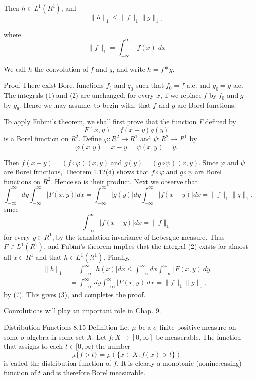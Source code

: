 Then $h \in L^1\left(R^1\right)$, and
$$
\|h\|_1 \leq\|f\|_1\|g\|_1,
$$

where
$$
\|f\|_1=\int_{-\infty}^{\infty}|f(x)| d x
$$

We call $h$ the convolution of $f$ and $g$, and write $h=f * g$.

Proof There exist Borel functions $f_0$ and $g_0$ such that $f_0=f$ a.e. and $g_0=g$ a.e. The integrals (1) and (2) are unchanged, for every $x$, if we replace $f$ by $f_0$ and $g$ by $g_0$. Hence we may assume, to begin with, that $f$ and $g$ are Borel functions.

To apply Fubini's theorem, we shall first prove that the function $F$ defined by
$$
F(x, y)=f(x-y) g(y)
$$
is a Borel function on $R^2$.
Define $\varphi: R^2 \rightarrow R^1$ and $\psi: R^2 \rightarrow R^1$ by
$$
\varphi(x, y)=x-y, \quad \psi(x, y)=y .
$$

Then $f(x-y)=(f \circ \varphi)(x, y)$ and $g(y)=(g \circ \psi)(x, y)$. Since $\varphi$ and $\psi$ are Borel functions, Theorem 1.12(d) shows that $f \circ \varphi$ and $g \circ \psi$ are Borel functions on $R^2$. Hence so is their product.
Next we observe that
$$
\int_{-\infty}^{\infty} d y \int_{-\infty}^{\infty}|F(x, y)| d x=\int_{-\infty}^{\infty}|g(y)| d y \int_{-\infty}^{\infty}|f(x-y)| d x=\|f\|_1\|g\|_1,
$$
since
$$
\int_{-\infty}^{\infty}|f(x-y)| d x=\|f\|_1
$$
for every $y \in R^1$, by the translation-invariance of Lebesgue measure.
Thus $F \in L^1\left(R^2\right)$, and Fubini's theorem implies that the integral (2) exists for almost all $x \in R^1$ and that $h \in L^1\left(R^1\right)$. Finally,
$$
\begin{aligned}
\|h\|_1 & =\int_{-\infty}^{\infty}|h(x)| d x \leq \int_{-\infty}^{\infty} d x \int_{-\infty}^{\infty}|F(x, y)| d y \\
& =\int_{-\infty}^{\infty} d y \int_{-\infty}^{\infty}|F(x, y)| d x=\|f\|_1\|g\|_1,
\end{aligned}
$$
by (7). This gives (3), and completes the proof.

Convolutions will play an important role in Chap. 9.

Distribution Functions
8.15 Definition Let $\mu$ be a $\sigma$-finite positive measure on some $\sigma$-algebra in some set $X$. Let $f: X \rightarrow[0, \infty]$ be measurable. The function that assigns to each $t \in[0, \infty)$ the number
$$
\mu\{f>t\}=\mu(\{x \in X: f(x)>t\})
$$
is called the distribution function of $f$. It is clearly a monotonic (nonincreasing) function of $t$ and is therefore Borel measurable.

